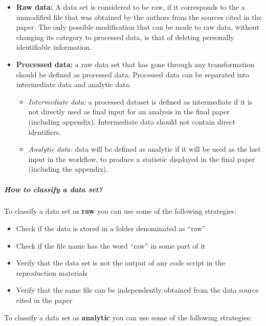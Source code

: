 \documentclass[]{book}
\providecommand{\tightlist}{%
  \setlength{\itemsep}{0pt}\setlength{\parskip}{0pt}}
\let\oldsubparagraph\subparagraph
\renewcommand{\subparagraph}[1]{\oldsubparagraph{#1}\mbox{}}
\begin{document}
\begin{itemize}
\item
  \textbf{Raw data:} A data set is considered to be raw, if it corresponds to the a unmodified file that was obtained by the authors from the sources cited in the paper. The only possible modification that can be made to raw data, without changing its category to processed data, is that of deleting personally identifiable information.
\item
  \textbf{Processed data:} a raw data set that has gone through any transformation should be defined as processed data. Processed data can be separated into intermediate data and analytic data.

  \begin{itemize}
  \tightlist
  \item
    \emph{Intermediate data:} a processed dataset is defined as intermediate if it is not directly used as final input for an analysis in the final paper (including appendix). Intermediate data should not contain direct identifiers.
  \item
    \emph{Analytic data:} data will be defined as analytic if it will be used as the last input in the workflow, to produce a statistic displayed in the final paper (including the appendix).
  \end{itemize}
\end{itemize}

\hypertarget{how-to-classify-a-data-set}{%
\subparagraph{How to classify a data set?}\label{how-to-classify-a-data-set}}

To classify a data set as \textbf{raw} you can use some of the following strategies:

\begin{itemize}
\tightlist
\item
  Check if the data is stored in a folder denominated as ``raw''\\
\item
  Check if the file name has the word ``raw'' in some part of it\\
\item
  Verify that the data set is not the output of any code script in the reproduction materials\\
\item
  Verify that the same file can be independently obtained from the data source cited in the paper
\end{itemize}

To classify a data set as \textbf{analytic} you can use some of the following strategies:
\end{document}
